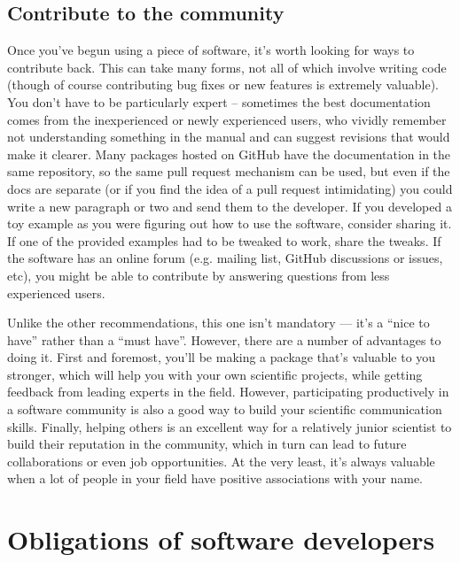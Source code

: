 \documentclass[9pt,training,ASAPversion]{livecoms}
\begin{document}
\subsection{Contribute to the community}

Once you've begun using a piece of software, it's worth looking for ways to
contribute back.  This can take many forms, not all of which involve writing
code (though of course contributing bug fixes or new features is extremely
valuable). You don't have to be particularly expert -- sometimes the best
documentation comes from the inexperienced or newly experienced users, who
vividly remember not understanding something in the manual and can suggest
revisions that would make it clearer.  Many packages hosted on GitHub have the
documentation in the same repository, so the same pull request mechanism can be
used, but even if the docs are separate (or if you find the idea of a pull
request intimidating) you could write a new paragraph or two and send them to
the developer. If you developed a toy example as you were figuring out how to
use the software, consider sharing it. If one of the provided examples had to be
tweaked to work, share the tweaks. If the software has an online forum (e.g.
mailing list, GitHub discussions or issues, etc), you might be able to
contribute by answering questions from less experienced users.

Unlike the other recommendations, this one isn't mandatory --- it's a ``nice to
have'' rather than a ``must have''. However, there are a number of advantages to
doing it. First and foremost, you'll be making a package that's valuable to you
stronger, which will help you with your own scientific projects, while getting
feedback from leading experts in the field. However, participating productively
in a software community is also a good way to build your scientific
communication skills. Finally, helping others is an excellent way for a
relatively junior scientist to build their reputation in the community, which in
turn can lead to future collaborations or even job opportunities. At the very
least, it's always valuable when a lot of people in your field have positive
associations with your name.

\section{Obligations of software developers}
\end{document}
